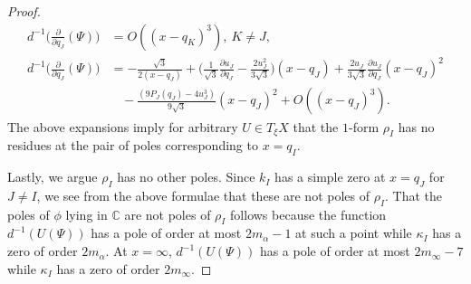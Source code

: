 \documentclass[a4paper,12pt,reqno]{amsart}
\numberwithin{equation}{section}
\numberwithin{counter2}{section}
\begin{document}
\begin{proof}
\begin{align}
d^{-1} \bigg(\frac{\partial}{\partial q_J}(\Psi)\bigg)&=  O((x-q_K)^3),  \ K \ne J, \label{magic_expansion_2}\\ 
d^{-1} \bigg(\frac{\partial}{\partial q_J}(\Psi)\bigg)&=  -\frac{\sqrt{3}}{2(x-q_J)} + \Big(\frac{1}{\sqrt{3}}\frac{\partial u_J}{\partial q_J} - \frac{2u_J^2}{3\sqrt{3}}\Big)(x-q_J) + \frac{2u_J}{3\sqrt{3}}\frac{\partial u_J}{\partial q_J}(x-q_J)^2 \nonumber \\ & \ \ \ \ - \frac{(9P_J(q_J) - 4u_J^3)}{9\sqrt{3}}(x-q_J)^2 + O((x-q_J)^3).  \label{magic_expansion_3}
\end{align}
The above expansions imply for arbitrary $U \in T_{\xi}X$  that the $1$-form $\rho_I$
has no residues at the pair of poles corresponding to $x = q_I$.  \par Lastly,  we argue $\rho_I$ has no other poles.  Since $k_I$ has a simple zero at $x = q_J$ for $J \ne I$,  we see from the above formulae that these are not poles of $\rho_I$.  That the poles of $\phi $ lying in $\mathbb{C}$ are not poles of $\rho_I$ follows because the function $d^{-1}(U(\Psi))$ has a pole of order at most $2m_\alpha - 1$ at such a point while $\kappa_I$ has a zero of order $2m_\alpha$.   At $x = \infty$,  $d^{-1}(U(\Psi))$ has a pole of order at most $2m_\infty - 7$ while $\kappa_I$ has a zero of order $2m_\infty$.  \end{proof}
\end{document}
